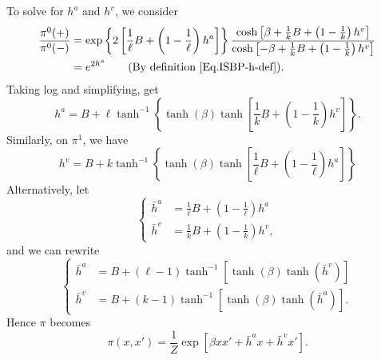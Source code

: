 \documentclass[12pt]{article}
\numberwithin{equation}{section}
\begin{document}
To solve for $h^a$ and $h^v$, we consider
\begin{equation*}
    \begin{aligned}
        \frac{\pi^0(+)}{\pi^0(-)} & = \exp\left\{2\left[\frac1\ell B + \left(1 - \frac1\ell\right) h^a\right]\right\} \frac{\cosh\left[\beta+\frac1k B + \left(1 - \frac1k\right)h^v\right]}{\cosh\left[-\beta+\frac1k B + \left(1 - \frac1k\right)h^v\right]} \\
                                  & = e^{2h^a} \qquad (\text{By definition }\ref{Eq.ISBP-h-def}).
    \end{aligned}
\end{equation*}
Taking log and simplifying, get
\begin{equation}
    h^a = B + \ell\tanh^{-1}\left\{\tanh(\beta)\tanh\left[\frac1k B + \left(1 - \frac1k\right)h^v\right]\right\}.
\end{equation}
Similarly, on $\pi^1$, we have
\begin{equation}
    h^v = B + k\tanh^{-1}\left\{\tanh(\beta)\tanh\left[\frac1\ell B + \left(1 - \frac1\ell\right)h^a\right]\right\}
\end{equation}
Alternatively, let 
\begin{equation*}
    \begin{cases}
        \bar{h}^a &= \frac1\ell B + \left(1 - \frac1\ell\right)h^a \\
        \bar{h}^v &= \frac1k B + \left(1 - \frac1k\right)h^v,
    \end{cases}
\end{equation*}
and we can rewrite 
\begin{equation}
    \begin{cases}
        \bar{h}^a &= B + (\ell-1)\tanh^{-1}\left[\tanh(\beta)\tanh(\bar{h}^v)\right] \\
        \bar{h}^v &= B + (k-1)\tanh^{-1}\left[\tanh(\beta)\tanh(\bar{h}^a)\right].
    \end{cases}
    \label{Eq.ISBP-hbar-cavity}
\end{equation}
Hence $\pi$ becomes
\begin{equation}
    \pi(x, x') = \frac1Z \exp\left[\beta xx' + \bar{h}^a x + \bar{h}^v x'\right].
    \label{Eq.ISBP-pi-hbar}
\end{equation}
\end{document}
